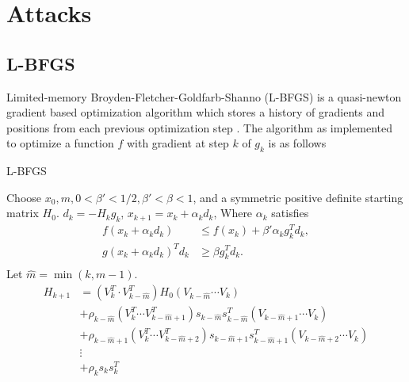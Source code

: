 \chapter{Attacks}
\section{L-BFGS}\label{appa}
Limited-memory Broyden-Fletcher-Goldfarb-Shanno (L-BFGS)
is a quasi-newton gradient based optimization algorithm which stores a history of gradients and positions from each previous optimization step \cite{liu1989limited}. The algorithm as implemented to optimize a function $f$ with gradient at step $k$ of $g_k$ is as follows

\begin{algorithm}[H]{L-BFGS}
\begin{algorithmic}
\State Choose $x_0, m, 0 < \beta' < 1/2, \beta' < \beta < 1$, and a symmetric positive definite starting matrix $H_0$. 
\State $d_k = -H_kg_k$,
\State $x_{k+1} = x_k + \alpha_kd_k$,
Where $\alpha_k$ satisfies 
\begin{align*}
    f(x_k + \alpha_k d_k) &\leq f(x_k) + \beta'\alpha_kg_k^Td_k,\\
    g(x_k + \alpha_k d_k)^Td_k &\geq \beta g_{k}^T d_k.\\
\end{align*}
\State Let $\hat m = \min(k, m - 1).$ 
\begin{align*}
    H_{k+1} &= (V_k^T \cdot V_{k-\hat m}^T)H_0(V_{k - \hat m}\cdots V_k)\\
    &+\rho_{k-\hat m}(V_k^T \cdots V_{k-\hat m+1}^T)s_{k - \hat m} s_{k - \hat m}^T(V_{k-\hat m+1} \cdots V_k)\\
    &+\rho_{k-\hat m + 1}(V_k^T \cdots V_{k-\hat m+2}^T)s_{k - \hat m + 1} s_{k - \hat m + 1}^T(V_{k-\hat m+2} \cdots V_k)\\
    & \vdots\\
    &+\rho_ks_ks_k^T\\
\end{align*}
\EndFor
\EndFor
\end{algorithmic}
\end{algorithm}

\newpage


